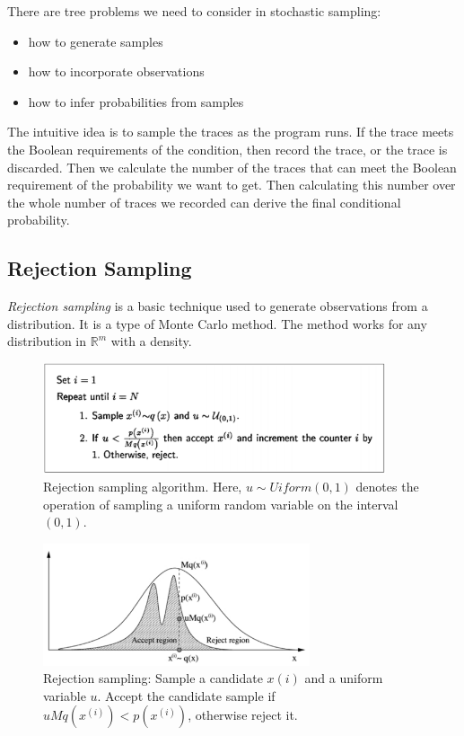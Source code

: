 There are tree problems we need to consider in stochastic sampling:
\begin{itemize}
  \item how to generate samples
  \item how to incorporate observations
  \item how to infer probabilities from samples
\end{itemize}
The intuitive idea is to sample the traces as the program runs. If the trace meets the Boolean requirements of the condition, then record the trace, or the trace is discarded. Then we calculate the number of the traces that can meet the Boolean requirement of the probability we want to get. Then calculating this number over the whole number of traces we recorded can derive the final conditional probability.

\subsection{Rejection Sampling}
\textit{Rejection sampling} is a basic technique used to generate observations from a distribution. It is a type of Monte Carlo method. The method works for any distribution in $\mathbb{R}^m$ with a density.

\begin{figure}
    \centering
    \includegraphics[width=0.9\textwidth]{figures/rj1.png}
    \caption{Rejection sampling algorithm. Here, $u \sim Uiform(0,1)$ denotes the operation of sampling a uniform random variable on the interval $(0,1)$.}
    \label{fig:rj1}
\end{figure}

\begin{figure}
    \centering
    \includegraphics[width=0.7\textwidth]{figures/rj2.png}
    \caption{Rejection sampling: Sample a candidate $x(i)$ and a uniform variable $u$. Accept the candidate sample if $uMq(x^{(i)}) < p(x^{(i)})$, otherwise reject it.}
    \label{fig:rj2}
\end{figure}

